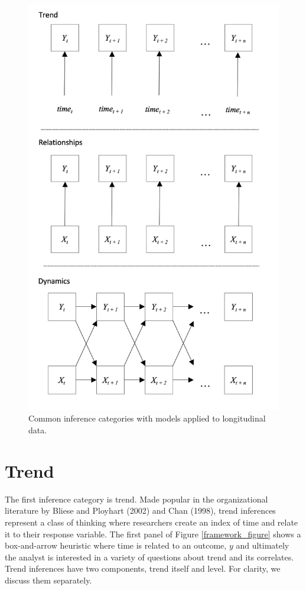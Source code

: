 \documentclass[english,,man]{apa6}
\theoremstyle{definition}
\theoremstyle{definition}
\theoremstyle{definition}
\theoremstyle{remark}
\begin{document}
\begin{figure}

{\centering \includegraphics[width=4.66in]{figures/dynamics/framework} 

}

\caption{Common inference categories with models applied to longitudinal data.\label{framework_figure}}\label{fig:unnamed-chunk-6}
\end{figure}

\hypertarget{trend}{%
\section{Trend}\label{trend}}

The first inference category is trend. Made popular in the
organizational literature by Bliese and Ployhart (2002) and Chan (1998),
trend inferences represent a class of thinking where researchers create
an index of time and relate it to their response variable. The first
panel of Figure \ref{framework_figure} shows a box-and-arrow heuristic
where time is related to an outcome, \(y\) and ultimately the analyst is
interested in a variety of questions about trend and its correlates.
Trend inferences have two components, trend itself and level. For
clarity, we discuss them separately.
\end{document}
